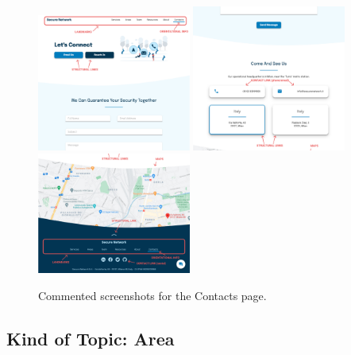 \documentclass[12pt]{report}
\begin{document}
\begin{figure}[H]
	\centering
	\includegraphics[width=0.45\textwidth]{high_fid_wireframes/contacts/1.png}
	\includegraphics[width=0.45\textwidth]{high_fid_wireframes/contacts/2.png}
	\includegraphics[width=0.45\textwidth]{high_fid_wireframes/contacts/3.png}
	\caption{Commented screenshots for the Contacts page.}
\end{figure}

\subsection{Kind of Topic: Area}
\end{document}
